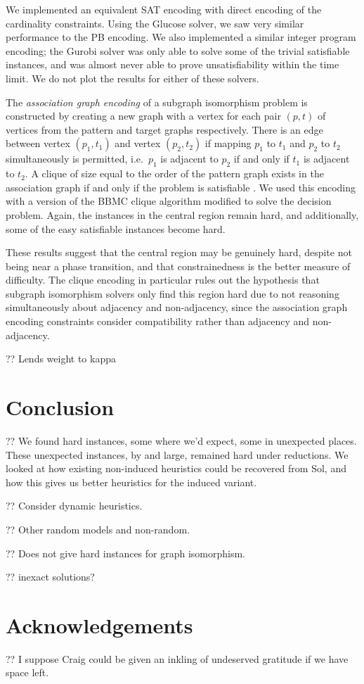 \documentclass[letterpaper]{article}
\begin{document}
We implemented an equivalent SAT encoding with direct encoding of the cardinality constraints. Using
the Glucose solver, we saw very similar performance to the PB encoding. We also implemented a
similar integer program encoding; the Gurobi solver was only able to solve some of the trivial
satisfiable instances, and was almost never able to prove unsatisfiability within the time limit. We
do not plot the results for either of these solvers.

The \emph{association graph encoding} of a subgraph isomorphism problem is constructed by creating a
new graph with a vertex for each pair $(p, t)$ of vertices from the pattern and target graphs
respectively. There is an edge between vertex $(p_1, t_1)$ and vertex $(p_2, t_2)$ if mapping $p_1$
to $t_1$ and $p_2$ to $t_2$ simultaneously is permitted, i.e.\ $p_1$ is adjacent to $p_2$ if and
only if $t_1$ is adjacent to $t_2$. A clique of size equal to the order of the pattern graph exists
in the association graph if and only if the problem is satisfiable \citep{Levi:1973}.  We used this
encoding with a version of the BBMC clique algorithm \citep{SanSegundo:2011} modified to solve the
decision problem. Again, the instances in the central region remain hard, and additionally, some of
the easy satisfiable instances become hard.

These results suggest that the central region may be genuinely hard, despite not being near a phase
transition, and that constrainedness is the better measure of difficulty. The clique encoding in
particular rules out the hypothesis that subgraph isomorphism solvers only find this region hard due
to not reasoning simultaneously about adjacency and non-adjacency, since the association graph
encoding constraints consider compatibility rather than adjacency and non-adjacency.

?? Lends weight to kappa

\section{Conclusion}

?? We found hard instances, some where we'd expect, some in unexpected places. These unexpected
instances, by and large, remained hard under reductions. We looked at how existing non-induced
heuristics could be recovered from Sol, and how this gives us better heuristics for the induced
variant.

?? Consider dynamic heuristics.

?? Other random models and non-random.

?? Does not give hard instances for graph isomorphism.

?? \citep{Lipets:2009} inexact solutions?

\section*{Acknowledgements}

?? I suppose Craig could be given an inkling of undeserved gratitude if we have space left.



\end{document}
